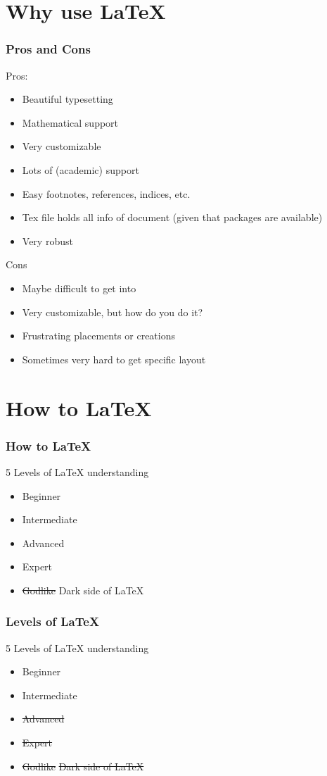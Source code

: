 \documentclass{beamer}
\renewcommand{\;}{\hspace{0.25em}}
\begin{document}
\section{Why use \LaTeX}
\begin{frame}
\frametitle{Pros and Cons}
	\begin{multicols}{2}
	Pros:
	\begin{itemize}
		\item<2-> Beautiful typesetting
		\item<3-> Mathematical support
		\item<4-> Very customizable
		\item<5-> Lots of (academic) support
		\item<6-> Easy footnotes, references, indices, etc.
		\item<7-> Tex file holds all info of document (given that packages are available)
		\item<8-> Very robust
	\end{itemize}
	\vfill
	\columnbreak
	Cons
	\begin{itemize}
		\item<9-> Maybe difficult to get into
		\item<10-> Very customizable, but how do you do it?
		\item<11-> Frustrating placements or creations
		\item<12-> Sometimes very hard to get specific layout
	\end{itemize}
\end{multicols}

\end{frame}

\section{How to \LaTeX}

\begin{frame}
	\frametitle{How to \LaTeX}
	5 Levels of \LaTeX\; understanding
	\begin{itemize}
		\item<2-> Beginner
		\item<3-> Intermediate
		\item<4-> Advanced
		\item<5-> Expert
		\item<6-> \st{Godlike} Dark side of \LaTeX
	\end{itemize}
\end{frame}

\begin{frame}
	\frametitle{Levels of \LaTeX}
	5 Levels of \LaTeX\; understanding
	\begin{itemize}
		\item Beginner
		\item Intermediate
		\item \st{Advanced}
		\item \st{Expert}
		\item \st{Godlike} \st{Dark side of \LaTeX}
	\end{itemize}
\end{frame}
\end{document}
